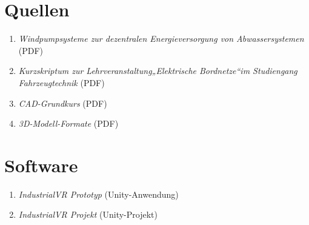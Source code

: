 

\appendix
\renewcommand\thesection{\Alph{section}}

\section{Quellen}

\begin{enumerate}[label=A\arabic*]

\item \textit{Windpumpsysteme zur dezentralen Energieversorgung von Abwassersystemen} (PDF)
\item \textit{Kurzskriptum zur Lehrveranstaltung„Elektrische Bordnetze“im Studiengang Fahrzeugtechnik} (PDF)
\item \textit{CAD-Grundkurs} (PDF)
\item \textit{3D-Modell-Formate} (PDF) 
\end{enumerate}

\section{Software}

\begin{enumerate}[label=B\arabic*]

\item \textit{IndustrialVR Prototyp} (Unity-Anwendung)
\item \textit{IndustrialVR Projekt} (Unity-Projekt)

\end{enumerate}